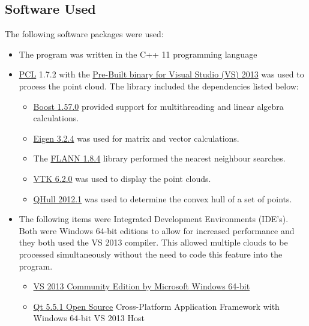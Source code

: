 \subsection{Software Used}
The following software packages were used:
\begin{itemize}
	\item The program was written in the C++ 11 programming language 
	\item \href{http://pointclouds.org/}{PCL} 1.7.2 with the \href{http://unanancyowen.com/?p=1255&lang=en}{Pre-Built binary for Visual Studio (VS) 2013} was used to process the point cloud. The library included the dependencies listed below:
	\begin{itemize}
		\item \href{http://www.boost.org/}{Boost 1.57.0} provided support for multithreading and linear algebra calculations.
		\item \href{http://eigen.tuxfamily.org/index.php?title=Main_Page}{Eigen 3.2.4} was used for matrix and vector calculations.
		\item The \href{http://www.cs.ubc.ca/research/flann/}{FLANN 1.8.4} library performed the nearest neighbour searches.
		\item \href{http://www.vtk.org/}{VTK 6.2.0} was used to display the point clouds.
		\item \href{http://www.qhull.org/}{QHull 2012.1} was used to determine the convex hull of a set of points.
	\end{itemize}
	\item The following items were Integrated Development Environments (IDE's). Both were Windows 64-bit editions to allow for increased performance and they both used the VS 2013 compiler. This allowed multiple clouds to be processed simultaneously without the need to code this feature into the program. 
	\begin{itemize}
		\item \href{https://www.visualstudio.com/en-us/downloads/download-visual-studio-vs.aspx}{VS 2013 Community Edition by Microsoft\textsuperscript{\textregistered} Windows 64-bit} 
		\item \href{http://www.qt.io/download-open-source/}{Qt 5.5.1 Open Source} Cross-Platform Application Framework with Windows 64-bit VS 2013 Host
	\end{itemize}
	

\end{itemize}
